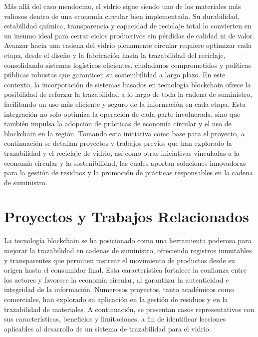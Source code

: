 Más allá del caso mendocino, el vidrio sigue siendo uno de los materiales más valiosos dentro de una economía circular bien implementada. Su durabilidad, estabilidad química, transparencia y capacidad de reciclaje total lo convierten en un insumo ideal para cerrar ciclos productivos sin pérdidas de calidad ni de valor. Avanzar hacia una cadena del vidrio plenamente circular requiere optimizar cada etapa, desde el diseño y la fabricación hasta la trazabilidad del reciclaje, consolidando sistemas logísticos eficientes, ciudadanos comprometidos y políticas públicas robustas que garanticen su sostenibilidad a largo plazo. En este contexto, la incorporación de sistemas basados en tecnología blockchain ofrece la posibilidad de reforzar la trazabilidad a lo largo de toda la cadena de suministro, facilitando un uso más eficiente y seguro de la información en cada etapa. Esta integración no solo optimiza la operación de cada parte involucrada, sino que también impulsa la adopción de prácticas de economía circular y el uso de blockchain en la región. Tomando esta iniciativa como base para el proyecto, a continuación se detallan proyectos y trabajos previos que han explorado la trazabilidad y el reciclaje de vidrio, así como otras iniciativas vinculadas a la economía circular y la sostenibilidad, las cuales aportan soluciones innovadoras para la gestión de residuos y la promoción de prácticas responsables en la cadena de suministro.

\section{Proyectos y Trabajos Relacionados}
\label{sec:related-work}

La tecnología blockchain se ha posicionado como una herramienta poderosa para mejorar la trazabilidad en cadenas de suministro, ofreciendo registros inmutables y transparentes que permiten rastrear el movimiento de productos desde su origen hasta el consumidor final. Esta característica fortalece la confianza entre los actores y favorece la economía circular, al garantizar la autenticidad e integridad de la información. Numerosos proyectos, tanto académicos como comerciales, han explorado su aplicación en la gestión de residuos y en la trazabilidad de materiales. A continuación, se presentan casos representativos con sus características, beneficios y limitaciones, a fin de identificar lecciones aplicables al desarrollo de un sistema de trazabilidad para el vidrio.

